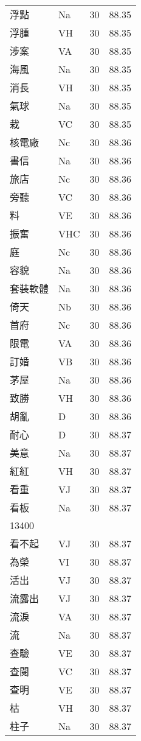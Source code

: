 \documentclass[twocolumn]{book}
\begin{document}
\begin{supertabular}{llrr}
浮點 & Na & 30 &  88.35\\
浮腫 & VH & 30 &  88.35\\
涉案 & VA & 30 &  88.35\\
海風 & Na & 30 &  88.35\\
消長 & VH & 30 &  88.35\\
氣球 & Na & 30 &  88.35\\
栽 & VC & 30 &  88.35\\
核電廠 & Nc & 30 &  88.36\\
書信 & Na & 30 &  88.36\\
旅店 & Nc & 30 &  88.36\\
旁聽 & VC & 30 &  88.36\\
料 & VE & 30 &  88.36\\
振奮 & VHC & 30 &  88.36\\
庭 & Nc & 30 &  88.36\\
容貌 & Na & 30 &  88.36\\
套裝軟體 & Na & 30 &  88.36\\
倚天 & Nb & 30 &  88.36\\
首府 & Nc & 30 &  88.36\\
限電 & VA & 30 &  88.36\\
訂婚 & VB & 30 &  88.36\\
茅屋 & Na & 30 &  88.36\\
致勝 & VH & 30 &  88.36\\
胡亂 & D & 30 &  88.36\\
耐心 & D & 30 &  88.37\\
美意 & Na & 30 &  88.37\\
紅紅 & VH & 30 &  88.37\\
看重 & VJ & 30 &  88.37\\
看板 & Na & 30 &  88.37\\
13400\\
看不起 & VJ & 30 &  88.37\\
為榮 & VI & 30 &  88.37\\
活出 & VJ & 30 &  88.37\\
流露出 & VJ & 30 &  88.37\\
流淚 & VA & 30 &  88.37\\
流 & Na & 30 &  88.37\\
查驗 & VE & 30 &  88.37\\
查閱 & VC & 30 &  88.37\\
查明 & VE & 30 &  88.37\\
枯 & VH & 30 &  88.37\\
柱子 & Na & 30 &  88.37\\

\end{supertabular}
\end{document}
